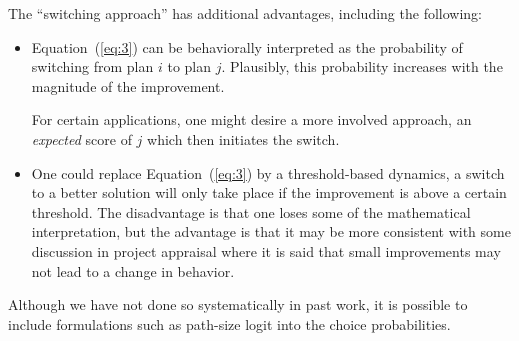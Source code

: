 The ``switching approach'' has additional advantages, including the
following:
\begin{itemize}

\item Equation~(\ref{eq:3}) can be behaviorally interpreted as the
  probability of switching from plan $i$ to plan $j$.  Plausibly, this
  probability increases with the magnitude of the improvement.  

  For certain applications, one might desire a more involved approach,
  \eg an \emph{expected} score of $j$ which then initiates the
  switch.

\item One could replace Equation~(\ref{eq:3}) by a threshold-based
  dynamics, \ie a switch to a better solution will only take place
  if the improvement is above a certain threshold.  The disadvantage
  is that one loses some of the mathematical interpretation, but the
  advantage is that it may be more consistent with some discussion in
  project appraisal where it is said that small improvements may not
  lead to a change in behavior.


\end{itemize}

Although we have not done so systematically in past work, it is 
possible to include formulations such as path-size logit 
\citep{ben-akiva-1999} into the choice probabilities.



